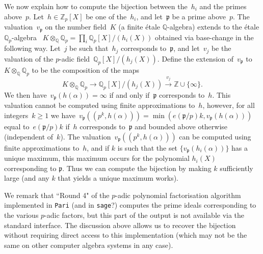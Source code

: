 \documentclass{article}
\def\Z{{\mathbb Z}}
\def\Q{{\mathbb Q}}
\def\p{{\mathfrak p}}
\begin{document}
We now explain how to compute the bijection between the~$h_i$ and the primes
above~$p$. Let~$h\in\Z_p[X]$ be one of the~$h_i$, and let~$\p$ be a prime
above~$p$. The valuation~$v_{\p}$ on the number field~$K$ (a finite \'etale $\Q$-algebra) extends to the \'etale $\Q_p$-algebra ~$K\otimes_{\Q}\Q_p = \prod_i
\Q_p[X]/(h_i(X))$ obtained via base-change in the following way.
Let~$j$ be such that~$h_{j}$ corresponds
to~$\p$, and let~$v_j$ be the valuation of the $p$-adic field~$\Q_p[X]/(h_j(X))$.
Define the extension of~$v_\p$ to $K\otimes_\Q\Q_p$ to be the composition of the maps
\[
  K\otimes_{\Q}\Q_p \longrightarrow \Q_p[X]/(h_j(X)) \stackrel{v_j}{\longrightarrow} \Z\cup\{\infty\}.
\]
We then have~$v_{\p}(h(\alpha)) = \infty$ if and only
if~$\p$ corresponds to~$h$.
This valuation cannot be computed using finite
approximations to~$h$, however, for all integers~$k\ge 1$ we have~$v_\p((p^k,h(\alpha)))
= \min(e(\p/p)k, v_\p(h(\alpha)))$ equal to~$e(\p/p)k$
if~$h$ corresponds to~$\p$ and bounded above otherwise (independent of~$k$). The
valuation~$v_\p((p^k,h(\alpha)))$ can be computed using finite approximations
to~$h$, and if $k$ is such that the set $\{v_\p(h_i(\alpha))\}$ has a unique maximum, this maximum occurs for the polynomial $h_i(X)$ corresponding to $\p$.
Thus we can compute the bijection by making $k$ sufficiently large (and any $k$ that yields a unique maximum works).

We remark that ``Round 4" of the $p$-adic polynomial factorisation algorithm implemented in \texttt{Pari} (and in \texttt{sage}?) \cite{something-maybe-Cohen?}
computes the prime ideals corresponding to the various $p$-adic factors, but
this part of the output is not available via the standard interface.
The discussion above allows us to recover the bijection without requiring direct access to this implementation (which may not be the same on other computer algebra systems in any case).
\end{document}

